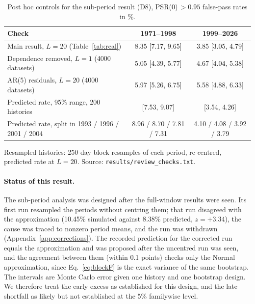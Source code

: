 \documentclass[11pt,a4paper]{article}
\begin{document}
\begin{table}[htbp]
\centering\small
\begin{threeparttable}
\caption{Post hoc controls for the sub-period result (D8), PSR(0)$\,>0.95$ false-pass rates in \%.}\label{tab:controls}
\begin{tabular}{@{}lcc@{}}
\toprule
Check & 1971--1998 & 1999--2026 \\
\midrule
Main result, $L=20$ (Table~\ref{tab:real}) & 8.35 [7.17, 9.65] & 3.85 [3.05, 4.79] \\
Dependence removed, $L=1$ (4000 datasets) & 5.05 [4.39, 5.77] & 4.67 [4.04, 5.38] \\
AR(5) residuals, $L=20$ (4000 datasets) & 5.97 [5.26, 6.75] & 5.58 [4.88, 6.33] \\
Predicted rate, 95\% range, 200 histories & [7.53, 9.07] & [3.54, 4.26] \\
Predicted rate, split in 1993 / 1996 / 2001 / 2004 & 8.96 / 8.70 / 7.81 / 7.31 & 4.10 / 4.08 / 3.92 / 3.79 \\
\bottomrule
\end{tabular}
\begin{tablenotes}\footnotesize
\item Resampled histories: 250-day block resamples of each period, re-centred, predicted rate at $L=20$. Source: \texttt{results/review\_checks.txt}.
\end{tablenotes}
\end{threeparttable}
\end{table}

\paragraph{Status of this result.} The sub-period analysis was designed after the full-window results were seen. Its first run resampled the periods without centring them; that run disagreed with the approximation (10.45\% simulated against 8.38\% predicted, $z=+3.34$), the cause was traced to nonzero period means, and the run was withdrawn (Appendix~\ref{app:corrections}). The recorded prediction for the corrected run equals the approximation and was proposed after the uncentred run was seen, and the agreement between them (within 0.1 points) checks only the Normal approximation, since Eq.~\eqref{eq:blockF} is the exact variance of the same bootstrap. The intervals are Monte Carlo error given one history and one bootstrap design. We therefore treat the early excess as established for this design, and the late shortfall as likely but not established at the 5\% familywise level.
\end{document}
